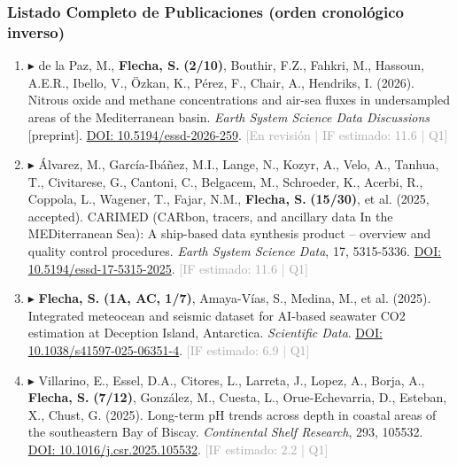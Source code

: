 \documentclass[11pt,a4paper]{article}
\begin{document}
\subsubsection{Listado Completo de Publicaciones (orden cronológico inverso)}

\begin{enumerate}[leftmargin=*]

\item $\blacktriangleright$ de la Paz, M., \textbf{Flecha, S.} \textbf{(2/10)}, Bouthir, F.Z., Fahkri, M., Hassoun, A.E.R., Ibello, V., Özkan, K., Pérez, F., Chair, A., Hendriks, I. (2026). Nitrous oxide and methane concentrations and air-sea fluxes in undersampled areas of the Mediterranean basin. \textit{Earth System Science Data Discussions} [preprint]. \href{https://doi.org/10.5194/essd-2026-259}{DOI: 10.5194/essd-2026-259}. \textcolor{darkgray}{\small [En revisión | IF estimado: 11.6 | Q1]}

\item $\blacktriangleright$ Álvarez, M., García-Ibáñez, M.I., Lange, N., Kozyr, A., Velo, A., Tanhua, T., Civitarese, G., Cantoni, C., Belgacem, M., Schroeder, K., Acerbi, R., Coppola, L., Wagener, T., Fajar, N.M., \textbf{Flecha, S.} \textbf{(15/30)}, et al. (2025, accepted). CARIMED (CARbon, tracers, and ancillary data In the MEDiterranean Sea): A ship-based data synthesis product – overview and quality control procedures. \textit{Earth System Science Data}, 17, 5315-5336. \href{https://doi.org/10.5194/essd-17-5315-2025}{DOI: 10.5194/essd-17-5315-2025}. \textcolor{darkgray}{\small [IF estimado: 11.6 | Q1]}

\item $\blacktriangleright$ \textbf{Flecha, S.} \textbf{(1A, AC, 1/7)}, Amaya-Vías, S., Medina, M., et al. (2025). Integrated meteocean and seismic dataset for AI-based seawater CO2 estimation at Deception Island, Antarctica. \textit{Scientific Data}. \href{https://doi.org/10.1038/s41597-025-06351-4}{DOI: 10.1038/s41597-025-06351-4}. \textcolor{darkgray}{\small [IF estimado: 6.9 | Q1]}

\item $\blacktriangleright$ Villarino, E., Essel, D.A., Citores, L., Larreta, J., Lopez, A., Borja, A., \textbf{Flecha, S.} \textbf{(7/12)}, González, M., Cuesta, L., Orue-Echevarria, D., Esteban, X., Chust, G. (2025). Long-term pH trends across depth in coastal areas of the southeastern Bay of Biscay. \textit{Continental Shelf Research}, 293, 105532. \href{https://doi.org/10.1016/j.csr.2025.105532}{DOI: 10.1016/j.csr.2025.105532}. \textcolor{darkgray}{\small [IF estimado: 2.2 | Q1]}


\end{enumerate}
\end{document}
